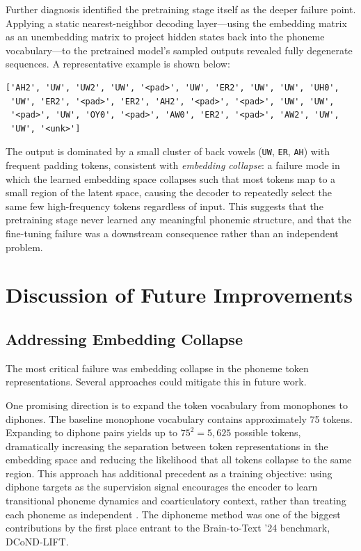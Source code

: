 \documentclass{article}
\begin{document}
Further diagnosis identified the pretraining stage itself as the deeper failure point.
Applying a static nearest-neighbor decoding layer---using the embedding matrix as an
unembedding matrix to project hidden states back into the phoneme vocabulary---to the
pretrained model's sampled outputs revealed fully degenerate sequences. A representative
example is shown below:

\begin{verbatim}
['AH2', 'UW', 'UW2', 'UW', '<pad>', 'UW', 'ER2', 'UW', 'UW', 'UH0',
 'UW', 'ER2', '<pad>', 'ER2', 'AH2', '<pad>', '<pad>', 'UW', 'UW',
 '<pad>', 'UW', 'OY0', '<pad>', 'AW0', 'ER2', '<pad>', 'AW2', 'UW',
 'UW', '<unk>']
\end{verbatim}

The output is dominated by a small cluster of back vowels (\texttt{UW}, \texttt{ER},
\texttt{AH}) with frequent padding tokens, consistent with \textit{embedding collapse}:
a failure mode in which the learned embedding space collapses such that most tokens map
to a small region of the latent space, causing the decoder to repeatedly select the same
few high-frequency tokens regardless of input. This suggests that the pretraining stage
never learned any meaningful phonemic structure, and that the fine-tuning failure was a
downstream consequence rather than an independent problem.

\section{Discussion of Future Improvements}

\subsection{Addressing Embedding Collapse}

The most critical failure was embedding collapse in the phoneme token representations.
Several approaches could mitigate this in future work.

One promising direction is to expand the token vocabulary from monophones to diphones.
The baseline monophone vocabulary contains approximately 75 tokens. Expanding to diphone
pairs yields up to $75^2 = 5{,}625$ possible tokens, dramatically increasing the
separation between token representations in the embedding space and reducing the
likelihood that all tokens collapse to the same region. This approach has additional
precedent as a training objective: using diphone targets as the supervision signal
encourages the encoder to learn transitional phoneme dynamics and coarticulatory context,
rather than treating each phoneme as independent \citep{willett2024lessons}. The diphoneme
method was one of the biggest contributions by the first place entrant to the Brain-to-Text '24
benchmark, DCoND-LIFT.
\end{document}
